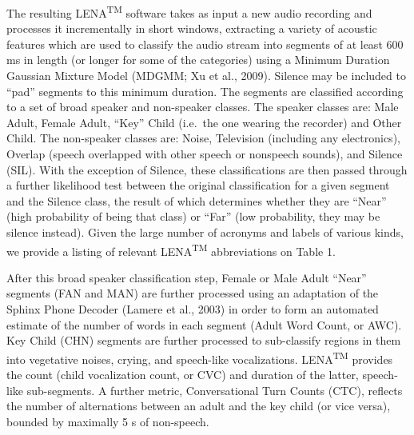 \documentclass[english,floatsintext,man]{apa6}
\begin{document}
The resulting LENA\textsuperscript{TM} software takes as input a new
audio recording and processes it incrementally in short windows,
extracting a variety of acoustic features which are used to classify the
audio stream into segments of at least 600 ms in length (or longer for
some of the categories) using a Minimum Duration Gaussian Mixture Model
(MDGMM; Xu et al., 2009). Silence may be included to \enquote{pad}
segments to this minimum duration. The segments are classified according
to a set of broad speaker and non-speaker classes. The speaker classes
are: Male Adult, Female Adult, \enquote{Key} Child (i.e.~the one wearing
the recorder) and Other Child. The non-speaker classes are: Noise,
Television (including any electronics), Overlap (speech overlapped with
other speech or nonspeech sounds), and Silence (SIL). With the exception
of Silence, these classifications are then passed through a further
likelihood test between the original classification for a given segment
and the Silence class, the result of which determines whether they are
\enquote{Near} (high probability of being that class) or \enquote{Far}
(low probability, they may be silence instead). Given the large number
of acronyms and labels of various kinds, we provide a listing of
relevant LENA\textsuperscript{TM} abbreviations on Table 1.

After this broad speaker classification step, Female or Male Adult
\enquote{Near} segments (FAN and MAN) are further processed using an
adaptation of the Sphinx Phone Decoder (Lamere et al., 2003) in order to
form an automated estimate of the number of words in each segment (Adult
Word Count, or AWC). Key Child (CHN) segments are further processed to
sub-classify regions in them into vegetative noises, crying, and
speech-like vocalizations. LENA\textsuperscript{TM} provides the count
(child vocalization count, or CVC) and duration of the latter,
speech-like sub-segments. A further metric, Conversational Turn Counts
(CTC), reflects the number of alternations between an adult and the key
child (or vice versa), bounded by maximally 5 s of non-speech.
\end{document}
